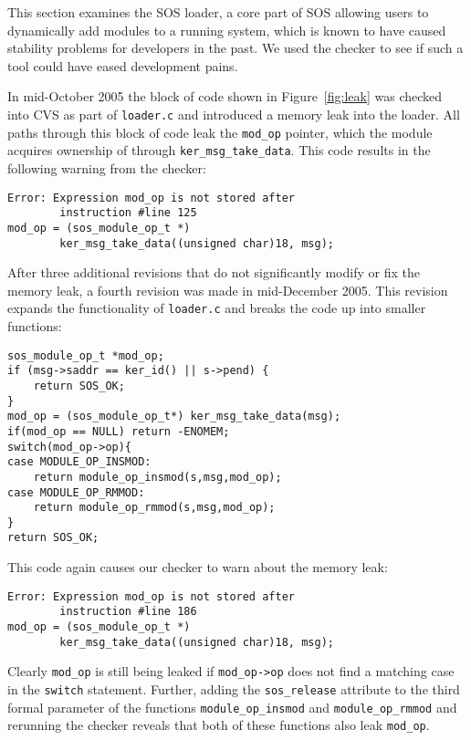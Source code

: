 This section examines the SOS loader, a core part of SOS allowing
users to dynamically add modules to a running system, which is
known to have caused stability problems for developers in the past.
We used the checker to see if such a tool could have eased development
pains.

In mid-October 2005 the block of code shown in Figure~\ref{fig:leak}
was checked into CVS as part of {\tt loader.c} and introduced a memory
leak into the loader.  All paths through this block of code leak the
{\tt mod\_op} pointer, which the module acquires ownership of through
{\tt ker\_msg\_take\_data}.  This code results in the following
warning from the checker:

\begin{scriptsize}
\begin{verbatim}
Error: Expression mod_op is not stored after 
        instruction #line 125
mod_op = (sos_module_op_t *)
        ker_msg_take_data((unsigned char)18, msg);
\end{verbatim}
\end{scriptsize}

After three additional revisions that do not significantly modify or
fix the memory leak, a fourth revision was made in mid-December 2005.
This revision expands the functionality of {\tt loader.c} and breaks
the code up into smaller functions:

\begin{scriptsize}
\begin{verbatim}
sos_module_op_t *mod_op;
if (msg->saddr == ker_id() || s->pend) {
    return SOS_OK;
}
mod_op = (sos_module_op_t*) ker_msg_take_data(msg);
if(mod_op == NULL) return -ENOMEM;
switch(mod_op->op){
case MODULE_OP_INSMOD:
    return module_op_insmod(s,msg,mod_op);
case MODULE_OP_RMMOD:
    return module_op_rmmod(s,msg,mod_op);
}
return SOS_OK;
\end{verbatim}
\end{scriptsize}

This code again causes our checker to warn about the memory leak:

\begin{scriptsize}
\begin{verbatim}
Error: Expression mod_op is not stored after 
        instruction #line 186
mod_op = (sos_module_op_t *)
        ker_msg_take_data((unsigned char)18, msg);
\end{verbatim}
\end{scriptsize}

Clearly {\tt mod\_op} is still being leaked if {\tt mod\_op->op} does
not find a matching case in the {\tt switch} statement.  Further,
adding the {\tt sos\_release} attribute to the third formal parameter
of the functions {\tt module\_op\_insmod} and {\tt module\_op\_rmmod}
and rerunning the checker reveals that both of these functions also
leak {\tt mod\_op}.

